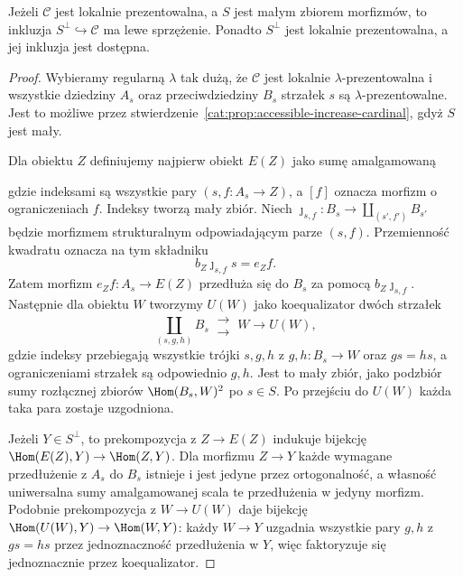\begin{twierdzenie}\label{cat:thm:accessible-orthogonal-reflection}
Jeżeli $\mathcal C$ jest lokalnie prezentowalna, a $S$ jest małym zbiorem morfizmów, to inkluzja $S^\perp\hookrightarrow\mathcal C$ ma lewe sprzężenie. Ponadto $S^\perp$ jest lokalnie prezentowalna, a jej inkluzja jest dostępna.
\end{twierdzenie}
\begin{proof}
Wybieramy regularną $\lambda$ tak dużą, że $\mathcal C$ jest lokalnie $\lambda$-prezentowalna i wszystkie dziedziny $A_s$ oraz przeciwdziedziny $B_s$ strzałek $s$ są $\lambda$-prezentowalne. Jest to możliwe przez stwierdzenie~\ref{cat:prop:accessible-increase-cardinal}, gdyż $S$ jest mały.

Dla obiektu $Z$ definiujemy najpierw obiekt $E(Z)$ jako sumę amalgamowaną
\begin{center}
\end{center}
gdzie indeksami są wszystkie pary $(s,f:A_s\to Z)$, a $[f]$ oznacza morfizm o ograniczeniach $f$. Indeksy tworzą mały zbiór. Niech $\jmath_{s,f}:B_s\to\coprod_{(s',f')}B_{s'}$ będzie morfizmem strukturalnym odpowiadającym parze $(s,f)$. Przemienność kwadratu oznacza na tym składniku
\[
 b_Z\jmath_{s,f}s=e_Zf.
\]
Zatem morfizm $e_Zf:A_s\to E(Z)$ przedłuża się do $B_s$ za pomocą $b_Z\jmath_{s,f}$. Następnie dla obiektu $W$ tworzymy $U(W)$ jako koequalizator dwóch strzałek
\[
 \coprod_{(s,g,h)} B_s
 \ \substack{\longrightarrow\\[-2pt]\longrightarrow}\ W
 \longrightarrow U(W),
\]
gdzie indeksy przebiegają wszystkie trójki $s,g,h$ z $g,h:B_s\to W$ oraz $gs=hs$, a ograniczeniami strzałek są odpowiednio $g,h$. Jest to mały zbiór, jako podzbiór sumy rozłącznej zbiorów $\Hom(B_s,W)^2$ po $s\in S$. Po przejściu do $U(W)$ każda taka para zostaje uzgodniona.

Jeżeli $Y\in S^\perp$, to prekompozycja z $Z\to E(Z)$ indukuje bijekcję $\Hom(E(Z),Y)\to\Hom(Z,Y)$. Dla morfizmu $Z\to Y$ każde wymagane przedłużenie z $A_s$ do $B_s$ istnieje i jest jedyne przez ortogonalność, a własność uniwersalna sumy amalgamowanej scala te przedłużenia w jedyny morfizm. Podobnie prekompozycja z $W\to U(W)$ daje bijekcję $\Hom(U(W),Y)\to\Hom(W,Y)$: każdy $W\to Y$ uzgadnia wszystkie pary $g,h$ z $gs=hs$ przez jednoznaczność przedłużenia w $Y$, więc faktoryzuje się jednoznacznie przez koequalizator.


\end{proof}
